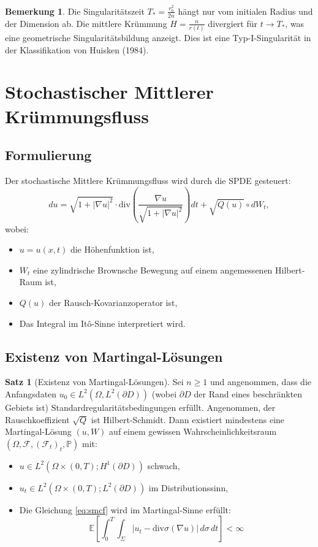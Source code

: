 \documentclass[a4paper,12pt]{article}
\theoremstyle{definition}
\newtheorem{satz}{Satz}
\newtheorem{bemerkung}{Bemerkung}
\begin{document}
\begin{bemerkung}
	Die Singularitätszeit $T_* = \frac{r_0^2}{2n}$ hängt nur vom initialen Radius und der Dimension ab. Die mittlere Krümmung $H = \frac{n}{r(t)}$ divergiert für $t \to T_*$, was eine geometrische Singularitätsbildung anzeigt. Dies ist eine Typ-I-Singularität in der Klassifikation von Huisken (1984).
\end{bemerkung}

\section{Stochastischer Mittlerer Krümmungsfluss}
\label{sec:stochastic}

\subsection{Formulierung}

Der stochastische Mittlere Krümmungsfluss wird durch die SPDE gesteuert:
\begin{equation}
\label{eq:smcf}
du = \sqrt{1 + |\nabla u|^2} \cdot \text{div}\left( \frac{\nabla u}{\sqrt{1 + |\nabla u|^2}} \right) dt + \sqrt{Q(u)} \circ dW_t,
\end{equation}
wobei:
\begin{itemize}
	\item $u = u(x, t)$ die Höhenfunktion ist,
	\item $W_t$ eine zylindrische Brownsche Bewegung auf einem angemessenen Hilbert-Raum ist,
	\item $Q(u)$ der Rausch-Kovarianzoperator ist,
	\item Das Integral im Itô-Sinne interpretiert wird.
\end{itemize}

\subsection{Existenz von Martingal-Lösungen}

\begin{satz}[Existenz von Martingal-Lösungen]
	\label{thm:existence}
	Sei $n \geq 1$ und angenommen, dass die Anfangsdaten $u_0 \in L^2(\Omega, L^2(\partial D))$ (wobei $\partial D$ der Rand eines beschränkten Gebiets ist) Standardregularitätsbedingungen erfüllt. Angenommen, der Rauschkoeffizient $\sqrt{Q}$ ist Hilbert-Schmidt. Dann existiert mindestens eine Martingal-Lösung $(u, W)$ auf einem gewissen Wahrscheinlichkeitsraum $(\Omega, \mathcal{F}, (\mathcal{F}_t)_t, \mathbb{P})$ mit:
	\begin{itemize}
		\item $u \in L^2(\Omega \times (0,T); H^1(\partial D))$ schwach,
		\item $u_t \in L^2(\Omega \times (0,T); L^2(\partial D))$ im Distributionssinn,
		\item Die Gleichung \eqref{eq:smcf} wird im Martingal-Sinne erfüllt:
		\[
		\mathbb{E}\left[\int_0^T \int_\Sigma |u_t - \text{div}\sigma(\nabla u)| \, d\sigma \, dt\right] < \infty
		\]
	\end{itemize}
\end{satz}
\end{document}
